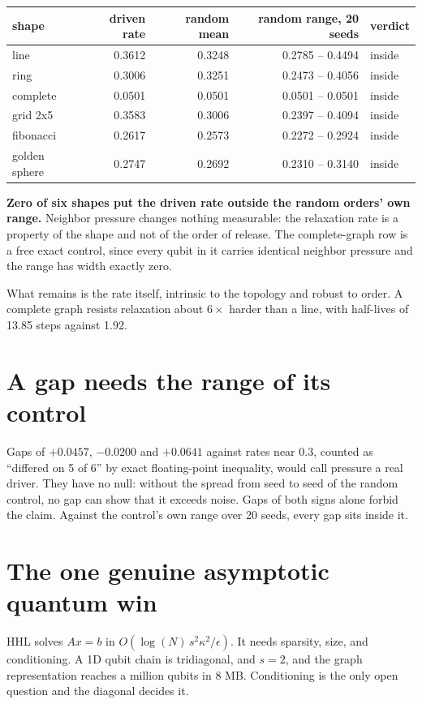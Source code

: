 \begin{center}
\begin{tabular}{lrrrl}
\toprule
shape & driven rate & random mean & random range, 20 seeds & verdict \\
\midrule
line & 0.3612 & 0.3248 & 0.2785 -- 0.4494 & inside \\
ring & 0.3006 & 0.3251 & 0.2473 -- 0.4056 & inside \\
complete & 0.0501 & 0.0501 & 0.0501 -- 0.0501 & inside \\
grid 2x5 & 0.3583 & 0.3006 & 0.2397 -- 0.4094 & inside \\
fibonacci & 0.2617 & 0.2573 & 0.2272 -- 0.2924 & inside \\
golden sphere & 0.2747 & 0.2692 & 0.2310 -- 0.3140 & inside \\
\bottomrule
\end{tabular}
\end{center}

\textbf{Zero of six shapes put the driven rate outside the random orders' own range.} Neighbor
pressure changes nothing measurable: the relaxation rate is a property of the shape and not of the
order of release. The complete-graph row is a free exact control, since every qubit in it carries
identical neighbor pressure and the range has width exactly zero.

What remains is the rate itself, intrinsic to the topology and robust to order. A complete graph
resists relaxation about \(6\times\) harder than a line, with half-lives of 13.85 steps against 1.92.

\section{A gap needs the range of its control}

Gaps of \(+0.0457\), \(-0.0200\) and \(+0.0641\) against rates near \(0.3\), counted as ``differed on 5
of 6'' by exact floating-point inequality, would call pressure a real driver. They have no null: without
the spread from seed to seed of the random control, no gap can show that it exceeds noise. Gaps of both
signs alone forbid the claim. Against the control's own range over 20 seeds, every gap sits inside it.

\section{The one genuine asymptotic quantum win}

HHL solves \(Ax = b\) in \(O(\log(N)\, s^2 \kappa^2 / \epsilon)\). It needs sparsity, size, and
conditioning. A 1D qubit chain is tridiagonal, and \(s = 2\), and the graph representation reaches a
million qubits in 8 MB. Conditioning is the only open question and the diagonal decides it.

